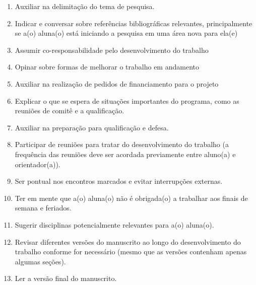 \begin{enumerate}
\item Auxiliar na delimitação do tema de pesquisa.
\item Indicar e conversar sobre referências bibliográficas relevantes,
  principalmente se a(o) aluna(o) está iniciando a pesquisa em uma
  área nova para ela(e) %
\item Assumir co-responsabilidade pelo desenvolvimento do
  trabalho %
\item Opinar sobre formas de melhorar o trabalho em
  andamento %
\item Auxiliar na realização de pedidos de financiamento para o
  projeto %
\item Explicar o que se espera de situações importantes do programa,
  como as reuniões de comitê e a qualificação.
\item Auxiliar na preparação para qualificação e defesa.
\item Participar de reuniões para tratar do desenvolvimento do
  trabalho (a frequência das reuniões deve ser acordada previamente
  entre aluno(a) e orientador(a)).
\item Ser pontual nos encontros marcados e evitar interrupções externas.
\item Ter em mente que a(o) aluna(o) não é obrigada(o) a trabalhar aos
  finais de semana e feriados.
\item Sugerir disciplinas potencialmente relevantes para a(o) aluna(o). 
\item Revisar diferentes versões do manuscrito ao longo do
  desenvolvimento do trabalho conforme for necessário (mesmo que as
  versões contenham apenas algumas seções).
\item Ler a versão final do manuscrito.
\end{enumerate}


